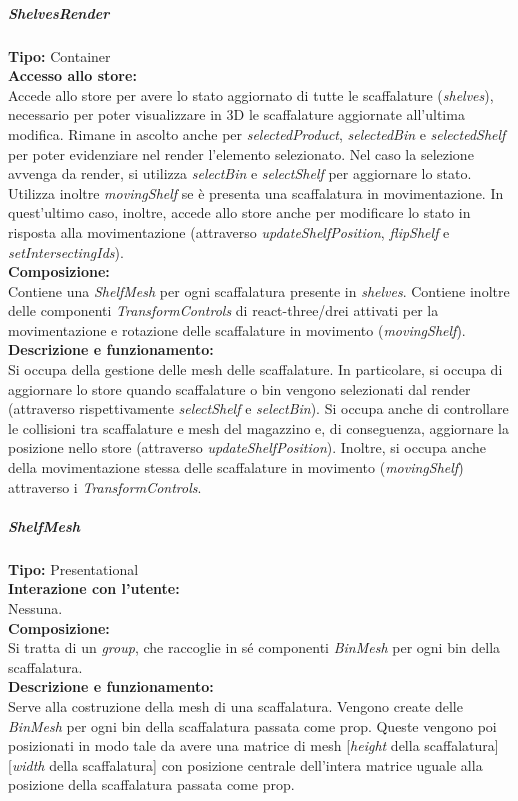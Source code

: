 \subparagraph{\colorbox{verde_uml}{ShelvesRender}}
\textbf{Tipo:} Container \\
\textbf{Accesso allo store:} \\
Accede allo store per avere lo stato aggiornato di tutte le scaffalature (\textit{shelves}), necessario per poter visualizzare in 3D le scaffalature aggiornate all'ultima modifica. Rimane in ascolto anche per \textit{selectedProduct}, \textit{selectedBin} e \textit{selectedShelf} per poter evidenziare nel render l'elemento selezionato. Nel caso la selezione avvenga da render, si utilizza \textit{selectBin} e \textit{selectShelf} per aggiornare lo stato. Utilizza inoltre \textit{movingShelf} se è presenta una scaffalatura in movimentazione. In quest'ultimo caso, inoltre, accede allo store anche per modificare lo stato in risposta alla movimentazione (attraverso \textit{updateShelfPosition}, \textit{flipShelf} e \textit{setIntersectingIds}).\\
\textbf{Composizione:} \\
Contiene una \textit{ShelfMesh} per ogni scaffalatura presente in \textit{shelves}. Contiene inoltre delle componenti \textit{TransformControls} di react-three/drei attivati per la movimentazione e rotazione delle scaffalature in movimento (\textit{movingShelf}).\\
\textbf{Descrizione e funzionamento:} \\
Si occupa della gestione delle mesh delle scaffalature. 
In particolare, si occupa di aggiornare lo store quando scaffalature o bin vengono selezionati dal render (attraverso rispettivamente \textit{selectShelf} e \textit{selectBin}). Si occupa anche di controllare le collisioni tra scaffalature e mesh del magazzino e, di conseguenza, aggiornare la posizione nello store (attraverso \textit{updateShelfPosition}). Inoltre, si occupa anche della movimentazione stessa delle scaffalature in movimento (\textit{movingShelf}) attraverso i \textit{TransformControls}.

\subparagraph{\colorbox{verde_uml}{ShelfMesh}}
\textbf{Tipo:} Presentational \\
\textbf{Interazione con l'utente:} \\
Nessuna.\\
\textbf{Composizione:} \\
Si tratta di un \textit{group}, che raccoglie in sé componenti \textit{BinMesh} per ogni bin della scaffalatura.\\
\textbf{Descrizione e funzionamento:} \\
Serve alla costruzione della mesh di una scaffalatura. Vengono create delle \textit{BinMesh} per ogni bin della scaffalatura passata come prop. Queste vengono poi posizionati in modo tale da avere una matrice di mesh [\textit{height} della scaffalatura][\textit{width} della scaffalatura] con posizione centrale dell'intera matrice uguale alla posizione della scaffalatura passata come prop. 

